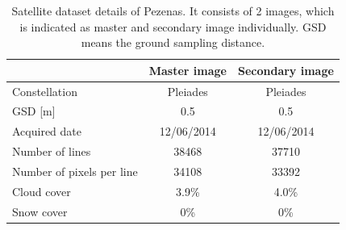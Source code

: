 
\begin{table}[htbp]
	\centering
	\begin{tabular}{||l|c|c||}\hline
		& Master image & Secondary image\\\hline
		Constellation & Pleiades & Pleiades \\
		GSD [m] & 0.5 & 0.5\\
		Acquired date & 12/06/2014 & 12/06/2014 \\
		Number of lines & 38468 & 37710 \\
		Number of pixels per line & 34108 & 33392 \\
		Cloud cover & 3.9\% & 4.0\% \\
		Snow cover & 0\% & 0\% \\\hline
	\end{tabular}
	\caption{Satellite dataset details of Pezenas. It consists of 2 images, which is indicated as master and secondary image individually. GSD means the ground sampling distance.}
	\label{SatelliteData}
\end{table}

